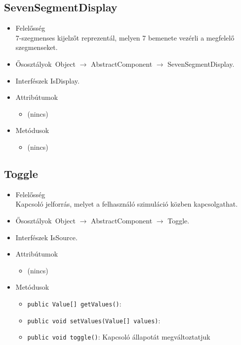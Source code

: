 \subsection{SevenSegmentDisplay}
\begin{itemize}
\item Felelősség\\
7-szegmenses kijelzőt reprezentál, melyen 7 bemenete vezérli a megfelelő szegmenseket.
\item Ősosztályok\ Object $\rightarrow{}$ AbstractComponent $\rightarrow{}$ SevenSegmentDisplay.
\item Interfészek IsDisplay.
\item Attribútumok $\ $
\begin{itemize}
\item (nincs)
\end{itemize}
\item Metódusok$\ $
\begin{itemize}
\item (nincs)
\end{itemize}
\end{itemize}

\subsection{Toggle}
\begin{itemize}
\item Felelősség\\
Kapcsoló jelforrás, melyet a felhasználó szimuláció közben kapcsolgathat.
\item Ősosztályok\ Object $\rightarrow{}$ AbstractComponent $\rightarrow{}$ Toggle.
\item Interfészek IsSource.
\item Attribútumok $\ $
\begin{itemize}
\item (nincs)
\end{itemize}
\item Metódusok$\ $
\begin{itemize}
	\item \texttt{public Value[] getValues()}: 
	\item \texttt{public void setValues(Value[] values)}: 
	\item \texttt{public void toggle()}: Kapcsoló állapotát megváltoztatjuk
\end{itemize}
\end{itemize}

